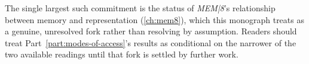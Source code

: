 The single largest such commitment is the status of \emph{MEM|8}'s
relationship between memory and representation (\cref{ch:mem8}), which
this monograph treats as a genuine, unresolved fork rather than
resolving by assumption. Readers should treat Part~\ref{part:modes-of-access}'s
results as conditional on the narrower of the two available readings
until that fork is settled by further work.

